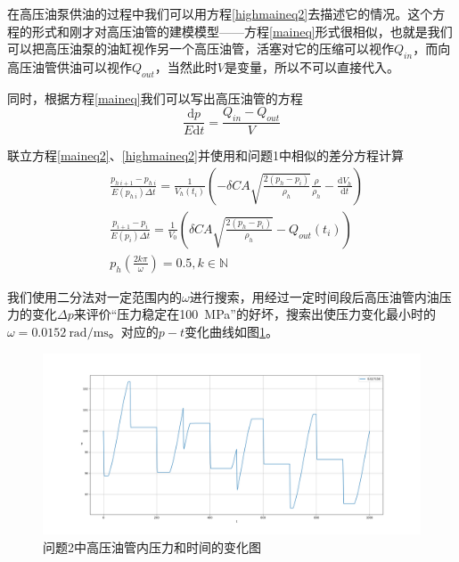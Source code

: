 \documentclass[12pt,AutoFakeBold]{article}%
\newcommand{\dif}{\mathrm{d}}
\begin{document}
    在高压油泵供油的过程中我们可以用方程\ref{highmaineq2}去描述它的情况。这个方程的形式和刚才对高压油管的建模模型——方程\ref{maineq}形式很相似，也就是我们可以把高压油泵的油缸视作另一个高压油管，活塞对它的压缩可以视作$Q_{in}$，而向高压油管供油可以视作$Q_{out}$，当然此时$V$是变量，所以不可以直接代入。\par
    同时，根据方程\ref{maineq}我们可以写出高压油管的方程
    \begin{equation}
        \frac{\dif p}{E\dif t}=\frac{Q_{in}-Q_{out}}{V}
        \label{maineq2}
    \end{equation}\par
    联立方程\ref{maineq2}、\ref{highmaineq2}并使用和问题1中相似的差分方程计算
    \begin{equation}
        \begin{aligned}
            &\frac{p_{h\ i+1}-p_{h\ i}}{E(p_{h\ i})\Delta t}=\frac{1}{V_h(t_i)}\left(-\delta CA\sqrt{\frac{2\left(p_h-p_i\right)}{\rho_h}}\frac{\rho}{\rho_h}-\frac{\dif V_h}{\dif t}\right)\\
            &\frac{p_{i+1}-p_i}{E(p_i)\Delta t}=\frac{1}{V_0}\left(\delta CA\sqrt{\frac{2\left(p_h-p_i\right)}{\rho_h}}-Q_{out}(t_i)\right)\\
            &p_h(\frac{2k\pi}{\omega})=0.5,k\in\mathbb{N}
        \end{aligned}
    \end{equation}\par
    我们使用二分法对一定范围内的$\omega$进行搜索，用经过一定时间段后高压油管内油压力的变化$\Delta p$来评价“压力稳定在\SI{100}{\MPa}”的好坏，搜索出使压力变化最小时的$\omega=\SI{0.0152}{\radian\per\ms}$。对应的$p-t$变化曲线如图\ref{ptfigure2}。\par
    \begin{figure}[h]
        \centering
        \includegraphics[scale = 0.32]{figure/2-1.png}
        \caption{问题2中高压油管内压力和时间的变化图}
        \label{ptfigure2}
    \end{figure}
\end{document}

